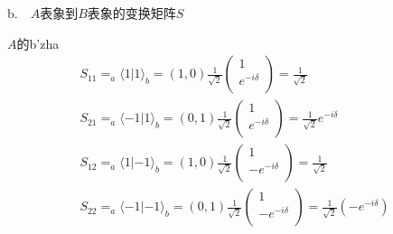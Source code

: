 b.\ \  $A$表象到$B$表象的变换矩阵$S$

$A$的b'zha
$$
\begin{array}{l}
	\left. S_{11}=_a\langle 1|1\rangle _b=(1,0)\frac{1}{\sqrt{2}}\left( \begin{array}{c}
	1\\
	e^{-i\delta}\\
\end{array} \right) =\frac{1}{\sqrt{2}} \right.\\
	S_{21}=_a\langle -1|1\rangle _b=(0,1)\frac{1}{\sqrt{2}}\left( \begin{array}{c}
	1\\
	e^{-i\delta}\\
\end{array} \right) =\frac{1}{\sqrt{2}}e^{-i\delta}\\
	S_{12}=_a\langle 1|-1\rangle _b=(1,0)\frac{1}{\sqrt{2}}\left( \begin{array}{c}
	1\\
	-e^{-i\delta}\\
\end{array} \right) =\frac{1}{\sqrt{2}}\\
	S_{22}=_a\langle -1|-1\rangle _b=(0,1)\frac{1}{\sqrt{2}}\left( \begin{array}{c}
	1\\
	-e^{-i\delta}\\
\end{array} \right) =\frac{1}{\sqrt{2}}\left( -e^{-i\delta} \right)\\
\end{array}
$$
